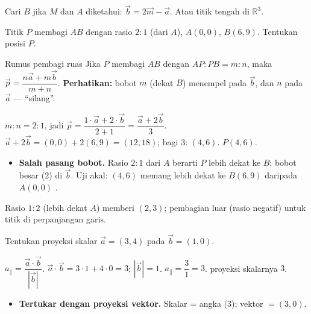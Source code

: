\begin{variasi}
Cari $B$ jika $M$ dan $A$ diketahui: $\vec b=2\vec m-\vec a$. Atau titik tengah
di $\mathbb R^3$.
\end{variasi}

\begin{soalbox}{}
Titik $P$ membagi $AB$ dengan rasio $2:1$ (dari $A$), $A(0,0)$, $B(6,9)$.
Tentukan posisi $P$.
\end{soalbox}

\begin{ingat}{Rumus pembagi ruas}
Jika $P$ membagi $AB$ dengan $AP:PB=m:n$, maka
$\vec p=\dfrac{n\vec a+m\vec b}{m+n}$. \textbf{Perhatikan:} bobot $m$ (dekat $B$)
menempel pada $\vec b$, dan $n$ pada $\vec a$ --- ``silang''.
\end{ingat}

\jawab
{} $m:n=2:1$, jadi $\vec p=\dfrac{1\cdot\vec a+2\cdot\vec b}{2+1}
=\dfrac{\vec a+2\vec b}{3}$.
 $\vec a+2\vec b=(0,0)+2(6,9)=(12,18)$; bagi $3$: $(4,6)$.
\jadi $P(4,6)$.

\begin{jebakan}
\begin{itemize}[leftmargin=*,topsep=2pt]
  \item \textbf{Salah pasang bobot.} Rasio $2:1$ dari $A$ berarti $P$ lebih dekat
  ke $B$; bobot besar ($2$) di $\vec b$. Uji akal: $(4,6)$ memang lebih dekat ke
  $B(6,9)$ daripada $A(0,0)$ \checkmark.
\end{itemize}
\end{jebakan}

\begin{variasi}
Rasio $1:2$ (lebih dekat $A$) memberi $(2,3)$; pembagian luar (rasio negatif)
untuk titik di perpanjangan garis.
\end{variasi}

\begin{soalbox}{}
Tentukan proyeksi skalar $\vec a=(3,4)$ pada $\vec b=(1,0)$.
\end{soalbox}

\jawab
{} $a_\parallel=\dfrac{\vec a\cdot\vec b}{|\vec b|}$.
 $\vec a\cdot\vec b=3\cdot1+4\cdot0=3$; $|\vec b|=1$.
 $a_\parallel=\dfrac31=3$.
\jadi proyeksi skalarnya $3$.

\begin{jebakan}
\begin{itemize}[leftmargin=*,topsep=2pt]
  \item \textbf{Tertukar dengan proyeksi vektor.} Skalar = angka ($3$); vektor
  $=(3,0)$.
\end{itemize}
\end{jebakan}

